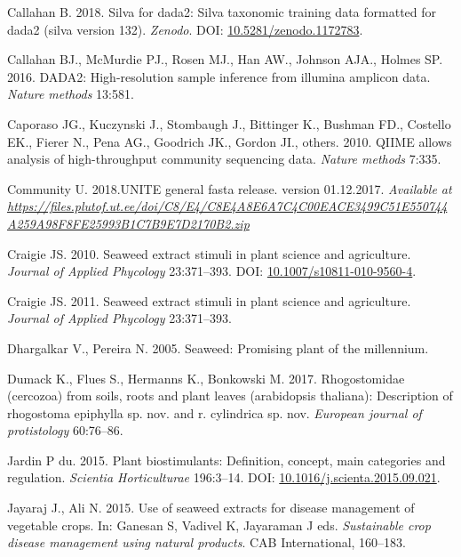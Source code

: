 \documentclass[11pt,]{article}
\begin{document}
\hypertarget{ref-silva}{}
Callahan B. 2018. Silva for dada2: Silva taxonomic training data
formatted for dada2 (silva version 132). \emph{Zenodo}. DOI:
\href{https://doi.org/10.5281/zenodo.1172783}{10.5281/zenodo.1172783}.

\hypertarget{ref-callahan2016dada2}{}
Callahan BJ., McMurdie PJ., Rosen MJ., Han AW., Johnson AJA., Holmes SP.
2016. DADA2: High-resolution sample inference from illumina amplicon
data. \emph{Nature methods} 13:581.

\hypertarget{ref-caporaso2010qiime}{}
Caporaso JG., Kuczynski J., Stombaugh J., Bittinger K., Bushman FD.,
Costello EK., Fierer N., Pena AG., Goodrich JK., Gordon JI., others.
2010. QIIME allows analysis of high-throughput community sequencing
data. \emph{Nature methods} 7:335.

\hypertarget{ref-UNITE2017}{}
Community U. 2018.UNITE general fasta release. version 01.12.2017.
\emph{Available at}
\emph{\url{https://files.plutof.ut.ee/doi/C8/E4/C8E4A8E6A7C4C00EACE3499C51E550744A259A98F8FE25993B1C7B9E7D2170B2.zip}}

\hypertarget{ref-Craigie2010}{}
Craigie JS. 2010. Seaweed extract stimuli in plant science and
agriculture. \emph{Journal of Applied Phycology} 23:371--393. DOI:
\href{https://doi.org/10.1007/s10811-010-9560-4}{10.1007/s10811-010-9560-4}.

\hypertarget{ref-craigie2011seaweed}{}
Craigie JS. 2011. Seaweed extract stimuli in plant science and
agriculture. \emph{Journal of Applied Phycology} 23:371--393.

\hypertarget{ref-dhargalkar2005seaweed}{}
Dhargalkar V., Pereira N. 2005. Seaweed: Promising plant of the
millennium.

\hypertarget{ref-dumack2017rhogostomidae}{}
Dumack K., Flues S., Hermanns K., Bonkowski M. 2017. Rhogostomidae
(cercozoa) from soils, roots and plant leaves (arabidopsis thaliana):
Description of rhogostoma epiphylla sp. nov. and r. cylindrica sp. nov.
\emph{European journal of protistology} 60:76--86.

\hypertarget{ref-duJardin2015}{}
Jardin P du. 2015. Plant biostimulants: Definition, concept, main
categories and regulation. \emph{Scientia Horticulturae} 196:3--14. DOI:
\href{https://doi.org/10.1016/j.scienta.2015.09.021}{10.1016/j.scienta.2015.09.021}.

\hypertarget{ref-Jayaraj2015sustainable}{}
Jayaraj J., Ali N. 2015. Use of seaweed extracts for disease management
of vegetable crops. In: Ganesan S, Vadivel K, Jayaraman J eds.
\emph{Sustainable crop disease management using natural products}. CAB
International, 160--183.
\end{document}
